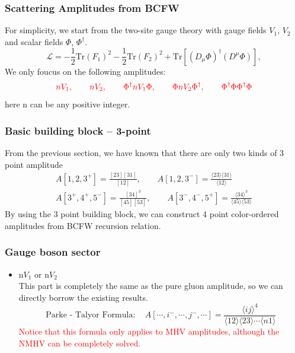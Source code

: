 \documentclass{beamer}
\newcommand{\avg}[1]{\langle #1 \rangle}
\begin{document}
\begin{frame}
    \frametitle{Scattering Amplitudes from BCFW}
    For simplicity, we start from the two-site gauge theory with gauge fields $V_1$, $V_2$ and scalar fields $\Phi$, $\Phi^\dagger$.
    \begin{equation*}
        \mathcal{L}=-\frac{1}{2}\mathrm{Tr}(F_1)^2-\frac{1}{2}\mathrm{Tr}(F_2)^2+\mathrm{Tr}[(D_\mu\Phi)^\dagger(D^\mu\Phi)],
    \end{equation*}
We only foucus on the following amplitudes:
\begin{equation*}
    \textcolor{red}{nV_1,\qquad nV_2,\qquad\Phi^\dagger nV_1 \Phi,\qquad \Phi nV_2 \Phi^\dagger,\qquad \Phi^\dagger \Phi\Phi^\dagger \Phi}
\end{equation*}
here n can be any positive integer.
\end{frame}
\begin{frame}
    \frametitle{Basic building block -- 3-point}
    From the previous section, we have known that there are only two kinds of 3 point amplitude
    \begin{gather*}
        A[1,2,3^+]=\frac{[23][31]}{[12]},\qquad A[1,2,3^-]=\frac{\avg{23}\!\avg{31}}{\avg{12}}\\
        A[3^+,4^+,5^-]=\frac{[34]^3}{[45][53]},\qquad A[3^-,4^-,5^+]=\frac{\avg{34}^3}{\avg{45}\!\avg{53}}
    \end{gather*}
    By using the 3 point building block, we can construct 4 point color-ordered amplitudes from BCFW recursion relation.
\end{frame}
\begin{frame}
    \frametitle{Gauge boson sector}
    \begin{itemize}
        \item n$ V_1$ or n$V_2$\\
        This part is completely the same as the pure gluon amplitude, so we can directly borrow the
        existing results.
        \begin{equation*}
            \boxed{\text{Parke - Talyor Formula}:\quad A[\cdots,i^-,\cdots,j^-,\cdots]=\frac{\avg{ij}^4}{\avg{12}\!\avg{23}\cdots\avg{n1}}}
        \end{equation*}
        \textcolor{red}{Notice that this formula only applies to MHV amplitudes, although the NMHV can be completely solved.}
    \end{itemize}
\end{frame}
\end{document}
